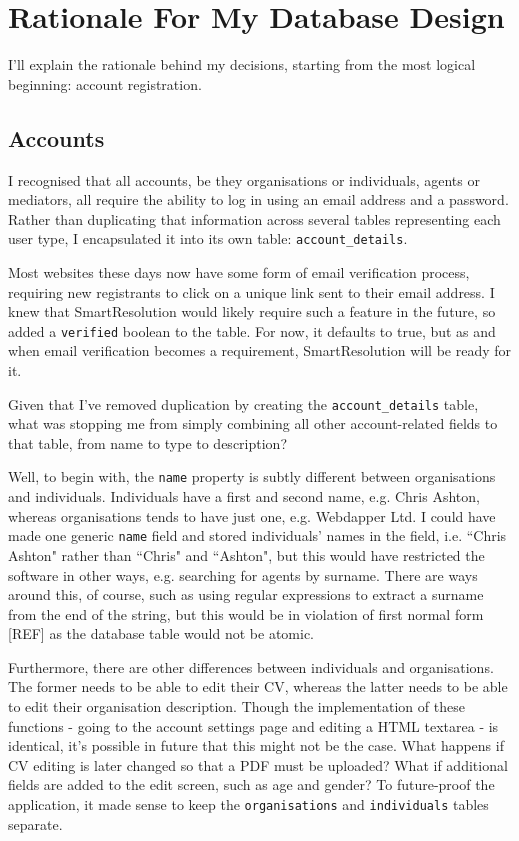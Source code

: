 \chapter{Rationale For My Database Design} \label{appendix:database}

I'll explain the rationale behind my decisions, starting from the most logical beginning: account registration.

\section{Accounts}

I recognised that all accounts, be they organisations or individuals, agents or mediators, all require the ability to log in using an email address and a password. Rather than duplicating that information across several tables representing each user type, I encapsulated it into its own table: \lstinline{account_details}.

Most websites these days now have some form of email verification process, requiring new registrants to click on a unique link sent to their email address. I knew that SmartResolution would likely require such a feature in the future, so added a \lstinline{verified} boolean to the table. For now, it defaults to true, but as and when email verification becomes a requirement, SmartResolution will be ready for it.

Given that I've removed duplication by creating the \lstinline{account_details} table, what was stopping me from simply combining all other account-related fields to that table, from name to type to description?

Well, to begin with, the \lstinline{name} property is subtly different between organisations and individuals. Individuals have a first and second name, e.g. Chris Ashton, whereas organisations tends to have just one, e.g. Webdapper Ltd. I could have made one generic \lstinline{name} field and stored individuals' names in the field, i.e. ``Chris Ashton" rather than ``Chris" and ``Ashton", but this would have restricted the software in other ways, e.g. searching for agents by surname. There are ways around this, of course, such as using regular expressions to extract a surname from the end of the string, but this would be in violation of first normal form [REF] as the database table would not be atomic.

Furthermore, there are other differences between individuals and organisations. The former needs to be able to edit their CV, whereas the latter needs to be able to edit their organisation description. Though the implementation of these functions - going to the account settings page and editing a HTML textarea - is identical, it's possible in future that this might not be the case. What happens if CV editing is later changed so that a PDF must be uploaded? What if additional fields are added to the edit screen, such as age and gender? To future-proof the application, it made sense to keep the \lstinline{organisations} and \lstinline{individuals} tables separate.

